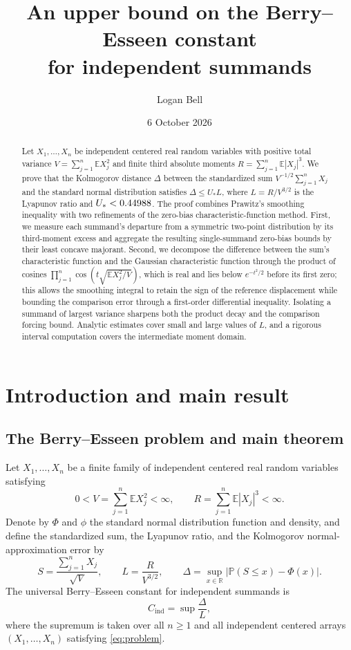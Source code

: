 \documentclass[11pt]{article}
\title{An upper bound on the Berry--Esseen constant\\ for independent summands}
\author{Logan Bell}
\date{6 October 2026}
\numberwithin{equation}{section}
\theoremstyle{remark}
\newcommand{\E}{\mathbb E}
\newcommand{\Prob}{\mathbb P}
\newcommand{\R}{\mathbb R}
\newcommand{\Cind}{C_{\mathrm{ind}}}
\begin{document}
\maketitle
\thispagestyle{fancy}
\begin{abstract}
Let $X_1,\ldots,X_n$ be independent centered real random variables with
positive total variance $V=\sum_{j=1}^n\E X_j^2$ and finite third absolute
moments $R=\sum_{j=1}^n\E|X_j|^3$. We prove that the Kolmogorov distance
$\Delta$ between the standardized sum $V^{-1/2}\sum_{j=1}^nX_j$ and the
standard normal distribution satisfies $\Delta\le U_*L$, where
$L=R/V^{3/2}$ is the Lyapunov ratio and $U_*<0.44988$.
The proof combines Prawitz's smoothing inequality with two refinements of
the zero-bias characteristic-function method. First, we measure each
summand's departure from a symmetric two-point distribution by its
third-moment excess and aggregate the resulting single-summand zero-bias
bounds by their least concave majorant. Second, we decompose the difference
between the sum's characteristic function and the Gaussian characteristic
function through the product of cosines $\prod_{j=1}^n\cos(t\sqrt{\E X_j^2/V})$,
which is real and lies below $e^{-t^2/2}$ before its first zero; this
allows the smoothing integral to retain the sign of the reference
displacement while bounding the comparison error through a first-order
differential inequality. Isolating a summand of largest variance sharpens
both the product decay and the comparison forcing bound. Analytic estimates
cover small and large values of $L$, and a rigorous interval computation
covers the intermediate moment domain.
\end{abstract}

\setcounter{tocdepth}{2}
\tableofcontents

\section{Introduction and main result}\label{sec:statement}

\subsection{The Berry--Esseen problem and main theorem}

Let $X_1,\ldots,X_n$ be a finite family of independent centered real random
variables satisfying
\[
  0<V=\sum_{j=1}^n\E X_j^2<\infty,
  \qquad R=\sum_{j=1}^n\E|X_j|^3<\infty.
\]
Denote by $\Phi$ and $\phi$ the standard normal distribution function and
density, and define the standardized sum, the Lyapunov ratio, and the
Kolmogorov normal-approximation error by
\begin{equation}\label{eq:problem}
  S=\frac{\sum_{j=1}^nX_j}{\sqrt V},\qquad
  L=\frac{R}{V^{3/2}},\qquad
  \Delta=\sup_{x\in\R}|\Prob(S\le x)-\Phi(x)|.
\end{equation}
The universal Berry--Esseen constant for independent summands is
\[
  \Cind=\sup\frac{\Delta}{L},
\]
where the supremum is taken over all $n\ge1$ and all independent centered
arrays $(X_1,\ldots,X_n)$ satisfying \eqref{eq:problem}.
\end{document}
